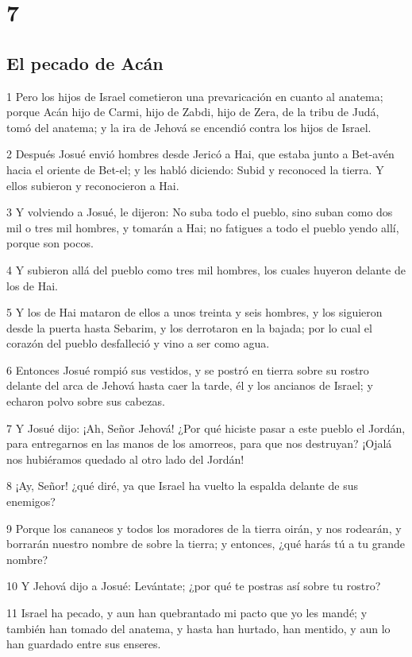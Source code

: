 \chapter{7}

\section*{El pecado de Acán}

\par 1 Pero los hijos de Israel cometieron una prevaricación en cuanto al anatema; porque Acán hijo de Carmi, hijo de Zabdi, hijo de Zera, de la tribu de Judá, tomó del anatema; y la ira de Jehová se encendió contra los hijos de Israel.
\par 2 Después Josué envió hombres desde Jericó a Hai, que estaba junto a Bet-avén hacia el oriente de Bet-el; y les habló diciendo: Subid y reconoced la tierra. Y ellos subieron y reconocieron a Hai.
\par 3 Y volviendo a Josué, le dijeron: No suba todo el pueblo, sino suban como dos mil o tres mil hombres, y tomarán a Hai; no fatigues a todo el pueblo yendo allí, porque son pocos.
\par 4 Y subieron allá del pueblo como tres mil hombres, los cuales huyeron delante de los de Hai.
\par 5 Y los de Hai mataron de ellos a unos treinta y seis hombres, y los siguieron desde la puerta hasta Sebarim, y los derrotaron en la bajada; por lo cual el corazón del pueblo desfalleció y vino a ser como agua.
\par 6 Entonces Josué rompió sus vestidos, y se postró en tierra sobre su rostro delante del arca de Jehová hasta caer la tarde, él y los ancianos de Israel; y echaron polvo sobre sus cabezas.
\par 7 Y Josué dijo: ¡Ah, Señor Jehová! ¿Por qué hiciste pasar a este pueblo el Jordán, para entregarnos en las manos de los amorreos, para que nos destruyan? ¡Ojalá nos hubiéramos quedado al otro lado del Jordán!
\par 8 ¡Ay, Señor! ¿qué diré, ya que Israel ha vuelto la espalda delante de sus enemigos?
\par 9 Porque los cananeos y todos los moradores de la tierra oirán, y nos rodearán, y borrarán nuestro nombre de sobre la tierra; y entonces, ¿qué harás tú a tu grande nombre?
\par 10 Y Jehová dijo a Josué: Levántate; ¿por qué te postras así sobre tu rostro?
\par 11 Israel ha pecado, y aun han quebrantado mi pacto que yo les mandé; y también han tomado del anatema, y hasta han hurtado, han mentido, y aun lo han guardado entre sus enseres.
